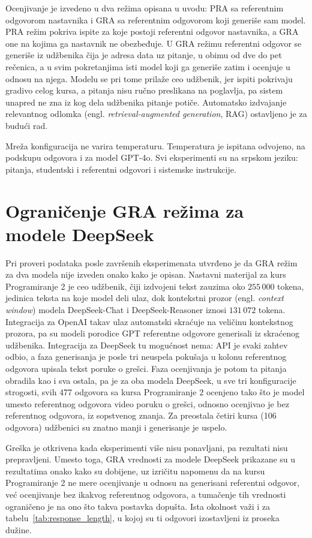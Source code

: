 Ocenjivanje je izvedeno u dva režima opisana u uvodu:
PRA sa referentnim odgovorom nastavnika i GRA sa referentnim odgovorom koji generiše sam model.
PRA režim pokriva ispite za koje postoji referentni odgovor nastavnika, a GRA one na kojima ga nastavnik ne obezbeđuje.
U GRA režimu referentni odgovor se generiše iz udžbenika čija je adresa data uz pitanje,
u obimu od dve do pet rečenica,
a u svim pokretanjima isti model koji ga generiše zatim i ocenjuje u odnosu na njega.
Modelu se pri tome prilaže ceo udžbenik, jer ispiti pokrivaju gradivo celog kursa,
a pitanja nisu ručno preslikana na poglavlja, pa sistem unapred ne zna iz kog dela udžbenika pitanje potiče.
Automatsko izdvajanje relevantnog odlomka (engl. \emph{retrieval-augmented generation}, RAG) ostavljeno je za budući rad.

Mreža konfiguracija ne varira temperaturu.
Temperatura je ispitana odvojeno, na podskupu odgovora i za model GPT-4o.
Svi eksperimenti su na srpskom jeziku: pitanja, studentski i referentni odgovori i sistemske instrukcije.

\section{Ograničenje GRA režima za modele DeepSeek}
\label{sec:gra-greska}

Pri proveri podataka posle završenih eksperimenata utvrđeno je da GRA režim za dva modela nije izveden onako kako je opisan.
Nastavni materijal za kurs Programiranje 2 je ceo udžbenik,
čiji izdvojeni tekst zauzima oko $255\,000$ tokena, jedinica teksta na koje model deli ulaz,
dok kontekstni prozor (engl. \emph{context window}) modela DeepSeek-Chat i DeepSeek-Reasoner iznosi $131\,072$ tokena.
Integracija za OpenAI takav ulaz automatski skraćuje na veličinu kontekstnog prozora,
pa su modeli porodice GPT referentne odgovore generisali iz skraćenog udžbenika.
Integracija za DeepSeek tu mogućnost nema: API je svaki zahtev odbio,
a faza generisanja je posle tri neuspela pokušaja u kolonu referentnog odgovora upisala tekst poruke o grešci.
Faza ocenjivanja je potom ta pitanja obradila kao i sva ostala,
pa je za oba modela DeepSeek, u sve tri konfiguracije strogosti, svih 477 odgovora sa kursa Programiranje 2 ocenjeno
tako što je model umesto referentnog odgovora video poruku o grešci, odnosno ocenjivao je bez referentnog odgovora, iz sopstvenog znanja.
Za preostala četiri kursa (106 odgovora) udžbenici su znatno manji i generisanje je uspelo.

Greška je otkrivena kada eksperimenti više nisu ponavljani, pa rezultati nisu prepravljeni.
Umesto toga, GRA vrednosti za modele DeepSeek prikazane su u rezultatima onako kako su dobijene,
uz izričitu napomenu da na kursu Programiranje 2 ne mere ocenjivanje u odnosu na generisani referentni odgovor,
već ocenjivanje bez ikakvog referentnog odgovora,
a tumačenje tih vrednosti ograničeno je na ono što takva postavka dopušta.
Ista okolnost važi i za tabelu~\ref{tab:response_length}, u kojoj su ti odgovori izostavljeni iz proseka dužine.

